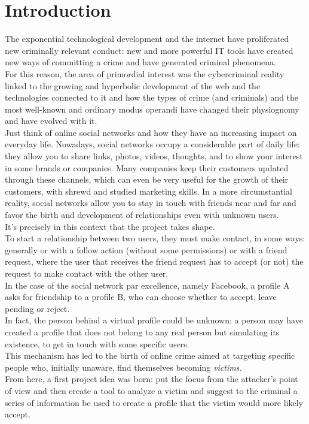 
\chapter{Introduction}
\label{cap:introduction}
The exponential technological development and the internet have proliferated new criminally relevant conduct: new and more powerful IT tools have created new ways of committing a crime and have generated criminal phenomena.
\\For this reason, the area of primordial interest was the cybercriminal reality linked to the growing and hyperbolic development of the web and the technologies connected to it and how the types of crime (and criminals) and the most well-known and ordinary modus operandi have changed their physiognomy and have evolved with it.
\\Just think of online social networks and how they have an increasing impact on everyday life. Nowadays, social networks occupy a considerable part of daily life: they allow you to share links, photos, videos, thoughts, and to show your interest in some brands or companies. Many companies keep their customers updated through these channels, which can even be very useful for the growth of their customers, with shrewd and studied marketing skills.
In a more circumstantial reality, social networks allow you to stay in touch with friends near and far and favor the birth and development of relationships even with unknown users.
\\It's precisely in this context that the project takes shape. 
\\To start a relationship between two users, they must make contact, in some ways: generally or with a follow action (without some permissions) or with a friend request, where the user that receives the friend request has to accept (or not) the request to make contact with the other user. 
\\In the case of the social network par excellence, namely Facebook, a profile A asks for friendship to a profile B, who can choose whether to accept, leave pending or reject.
\\In fact, the person behind a virtual profile could be unknown: a person may have created a profile that does not belong to any real person but simulating its existence, to get in touch with some specific users.
\\This mechanism has led to the birth of online crime aimed at targeting specific people who, initially unaware, find themselves becoming \textit{victims}.\\From here, a first project idea was born: put the focus from the attacker's point of view and then create a tool to analyze a victim and suggest to the criminal a series of information be used to create a profile that the victim would more likely accept.

